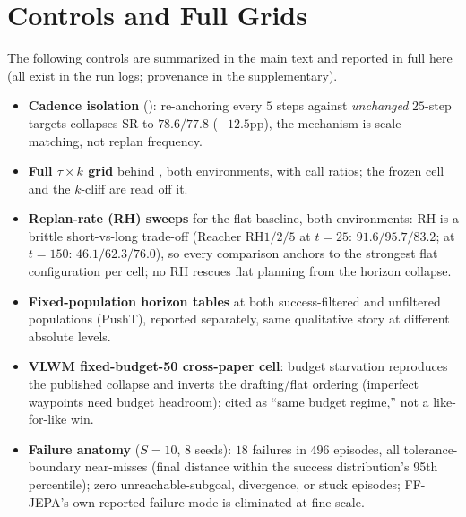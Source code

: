 \documentclass{article}
\begin{document}
\section{Controls and Full Grids}
\label{app:controls}
The following controls are summarized in the main text and reported in full here (all
exist in the run logs; provenance in the supplementary).
\begin{itemize}[itemsep=1pt,topsep=2pt]
\item \textbf{Cadence isolation} (): re-anchoring every $5$ steps
against \emph{unchanged} $25$-step targets collapses SR to $78.6/77.8$ ($-12.5$pp), the mechanism is scale matching, not replan frequency.
\item \textbf{Full $\tau{\times}k$ grid} behind , both environments,
with call ratios; the frozen cell and the $k$-cliff are read off it.
\item \textbf{Replan-rate (RH) sweeps} for the flat baseline, both environments: RH is a
brittle short-vs-long trade-off (Reacher RH$1/2/5$ at $t{=}25$: $91.6/95.7/83.2$; at
$t{=}150$: $46.1/62.3/76.0$), so every comparison anchors to the strongest flat
configuration per cell; no RH rescues flat planning from the horizon collapse.
\item \textbf{Fixed-population horizon tables} at both success-filtered and unfiltered
populations (PushT), reported separately, same qualitative story at different absolute
levels.
\item \textbf{VLWM \citep{vlwm} fixed-budget-50 cross-paper cell}: budget starvation reproduces the
published collapse and inverts the drafting/flat ordering (imperfect waypoints need
budget headroom); cited as ``same budget regime,'' not a like-for-like win.
\item \textbf{Failure anatomy} ($S{=}10$, 8 seeds): $18$ failures in $496$ episodes, all
tolerance-boundary near-misses (final distance within the success distribution's 95th
percentile); zero unreachable-subgoal, divergence, or stuck episodes; FF-JEPA's own
reported failure mode is eliminated at fine scale.
\end{itemize}
\end{document}
